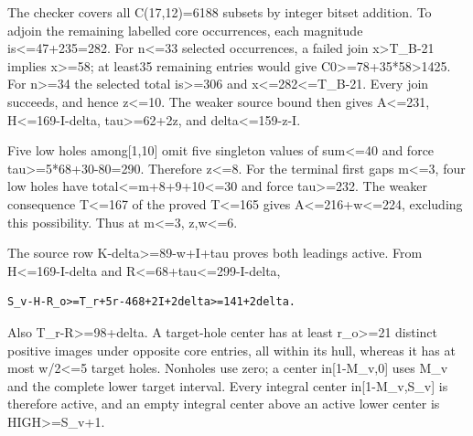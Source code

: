 \documentclass[10pt,a4paper]{article}
\theoremstyle{definition}
\begin{document}
The checker covers all C(17,\allowbreak{}12)=\allowbreak{}6188 subsets by integer bitset addition.
To adjoin the remaining labelled core occurrences,\allowbreak{} each magnitude
is\textless=\allowbreak{}47+\allowbreak{}235=\allowbreak{}282. For n\textless=\allowbreak{}33 selected occurrences,\allowbreak{} a failed
join x\textgreater T\_\allowbreak{}B-21 implies x\textgreater=\allowbreak{}58; at least35
remaining entries would give C0\textgreater=\allowbreak{}78+\allowbreak{}35*58\textgreater1425.
For n\textgreater=\allowbreak{}34 the selected total is\textgreater=\allowbreak{}306 and
x\textless=\allowbreak{}282\textless=\allowbreak{}T\_\allowbreak{}B-21. Every join succeeds,\allowbreak{} and hence
z\textless=\allowbreak{}10. The weaker source bound then gives A\textless=\allowbreak{}231,\allowbreak{}
H\textless=\allowbreak{}169-I-delta,\allowbreak{} tau\textgreater=\allowbreak{}62+\allowbreak{}2z,\allowbreak{} and
delta\textless=\allowbreak{}159-z-I.

Five low holes among{[}1,\allowbreak{}10{]} omit five singleton values of
sum\textless=\allowbreak{}40 and force tau\textgreater=\allowbreak{}5*68+\allowbreak{}30-80=\allowbreak{}290. Therefore
z\textless=\allowbreak{}8. For the terminal first gaps m\textless=\allowbreak{}3,\allowbreak{} four low holes
have total\textless=\allowbreak{}m+\allowbreak{}8+\allowbreak{}9+\allowbreak{}10\textless=\allowbreak{}30 and force tau\textgreater=\allowbreak{}232.
The weaker consequence T\textless=\allowbreak{}167 of the proved T\textless=\allowbreak{}165 gives
A\textless=\allowbreak{}216+\allowbreak{}w\textless=\allowbreak{}224,\allowbreak{} excluding this possibility. Thus at
m\textless=\allowbreak{}3,\allowbreak{} z,\allowbreak{}w\textless=\allowbreak{}6.

The source row K-delta\textgreater=\allowbreak{}89-w+\allowbreak{}I+\allowbreak{}tau proves both leadings
active. From H\textless=\allowbreak{}169-I-delta and
R\textless=\allowbreak{}68+\allowbreak{}tau\textless=\allowbreak{}299-I-delta,\allowbreak{}

\begin{lstlisting}
S_v-H-R_o>=T_r+5r-468+2I+2delta>=141+2delta.
\end{lstlisting}

Also T\_\allowbreak{}r-R\textgreater=\allowbreak{}98+\allowbreak{}delta. A target-hole center has at least
r\_\allowbreak{}o\textgreater=\allowbreak{}21 distinct positive images under opposite core
entries,\allowbreak{} all within its hull,\allowbreak{} whereas it has at most w/2\textless=\allowbreak{}5
target holes. Nonholes use zero; a center in{[}1-M\_\allowbreak{}v,\allowbreak{}0{]} uses M\_\allowbreak{}v and
the complete lower target interval. Every integral center
in{[}1-M\_\allowbreak{}v,\allowbreak{}S\_\allowbreak{}v{]} is therefore active,\allowbreak{} and an empty integral center
above an active lower center is HIGH\textgreater=\allowbreak{}S\_\allowbreak{}v+\allowbreak{}1.
\end{document}
